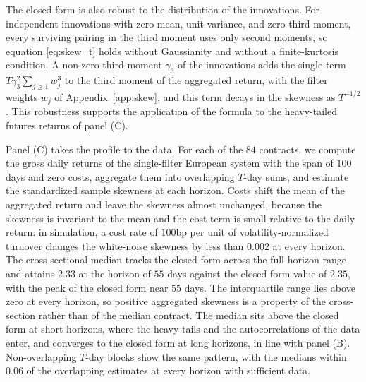 \documentclass[hidelinks]{siamonline250211}
\begin{document}
The closed form is also robust to the distribution of the innovations. For independent innovations with zero mean, unit variance, and zero third moment, every surviving pairing in the third moment uses only second moments, so equation \eqref{eq:skew_t} holds without Gaussianity and without a finite-kurtosis condition. A non-zero third moment $\gamma_{3}$ of the innovations adds the single term $T\gamma^{2}_{3}\sum_{j\geq 1}w^{3}_{j}$ to the third moment of the aggregated return, with the filter weights $w_{j}$ of Appendix~\ref{app:skew}, and this term decays in the skewness as $T^{-1/2}$. This robustness supports the application of the formula to the heavy-tailed futures returns of panel (C).

Panel (C) takes the profile to the data. For each of the $84$ contracts, we compute the gross daily returns of the single-filter European system with the span of $100$ days and zero costs, aggregate them into overlapping $T$-day sums, and estimate the standardized sample skewness at each horizon. Costs shift the mean of the aggregated return and leave the skewness almost unchanged, because the skewness is invariant to the mean and the cost term is small relative to the daily return: in simulation, a cost rate of $100$bp per unit of volatility-normalized turnover changes the white-noise skewness by less than $0.002$ at every horizon. The cross-sectional median tracks the closed form across the full horizon range and attains $2.33$ at the horizon of $55$ days against the closed-form value of $2.35$, with the peak of the closed form near $55$ days. The interquartile range lies above zero at every horizon, so positive aggregated skewness is a property of the cross-section rather than of the median contract. The median sits above the closed form at short horizons, where the heavy tails and the autocorrelations of the data enter, and converges to the closed form at long horizons, in line with panel (B). Non-overlapping $T$-day blocks show the same pattern, with the medians within $0.06$ of the overlapping estimates at every horizon with sufficient data.
\end{document}
